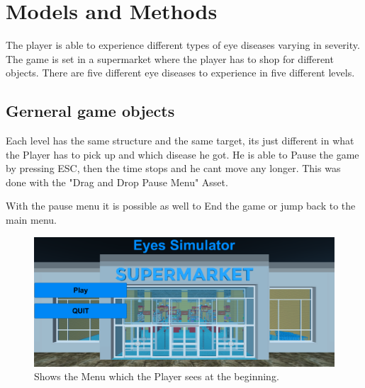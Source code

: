 \documentclass{sig-alternate-05-2015}
\begin{document}
\section{Models and Methods}


The player is able to experience different types of eye diseases varying in severity. The game is set in a supermarket where the player has to shop for different objects. There are five different eye diseases to experience in five different levels.

\subsection{Gerneral game objects}

Each level has the same structure and the same target, its just different in what the Player has to pick up and which disease he got. He is able to Pause the game by pressing ESC, then the time stops and he cant move any longer. This was done with the "Drag and Drop Pause Menu" Asset. 

With the pause menu it is possible as well to End the game or jump back to the main menu.

\begin{figure}
    \centering
    \includegraphics[width=\columnwidth]{Menu.png}
    \caption{Shows the Menu which the Player sees at the beginning.}
    \label{fig:menu}
\end{figure}
\end{document}
